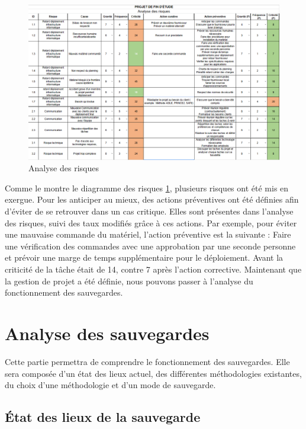 \documentclass[pfe]{tnreport} %
\begin{document}
\begin{figure}[!h]
 \centering
 \includegraphics[width=17cm]{figures/risques.png}
 \caption{Analyse des risques}
 \label{fig:risk}
\end{figure}

Comme le montre le diagramme des risques \ref{fig:risk}, plusieurs risques ont été mis en exergue. Pour les anticiper au mieux, des actions préventives ont été définies afin d'éviter de se retrouver dans un cas critique. Elles sont présentes dans l'analyse des risques, suivi des taux modifiés grâce à ces actions. \newline
Par exemple, pour éviter une mauvaise commande du matériel, l'action préventive est la suivante : Faire une vérification des commandes avec une approbation par une seconde personne et prévoir une marge de temps supplémentaire pour le déploiement. Avant la criticité de la tâche était de 14, contre 7 après l'action corrective. \newline
Maintenant que la gestion de projet a été définie, nous pouvons passer à l'analyse du fonctionnement des sauvegardes.
\chapter{Analyse des sauvegardes}
Cette partie permettra de comprendre le fonctionnement des sauvegardes. Elle sera composée d'un état des lieux actuel, des différentes méthodologies existantes, du choix d'une méthodologie et d'un mode de sauvegarde.

\section{État des lieux de la sauvegarde}
\end{document}

